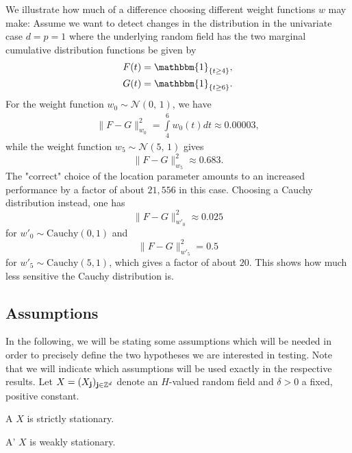 \begin{ex} \label{example: two distribution function dependent on weight function}
    We illustrate how much of a difference choosing different weight functions $w$ may make: Assume we want to detect changes in the distribution in the univariate case $d=p=1$ where the underlying random field has the two marginal cumulative distribution functions be given by
    \begin{align*}
        & F(t) = \mathbbm{1}_{\{t \geq 4\}}, \\
        & G(t) = \mathbbm{1}_{\{t \geq 6\}}.
    \end{align*}
    For the weight function $w_0 \sim \mathcal{N}(0,\, 1)$, we have
    \begin{align*}
        \| F - G \|^2_{w_0} = \int\limits_{4}^6 w_0(t)dt \approx 0.00003,
    \end{align*}
    while the weight function $w_{5} \sim \mathcal{N}(5,\, 1)$ gives
    \[  \| F - G \|^2_{w_{5}} \approx 0.683. \]
    The "correct" choice of the location parameter amounts to an increased performance by a factor of about $21,556$ in this case.
    Choosing a Cauchy distribution instead, one has
    \[ \| F - G \|^2_{w'_{0}} \approx 0.025 \]
    for $w'_0 \sim \mathrm{Cauchy}(0, 1)$ and
    \[ \| F - G \|^2_{w'_{5}} = 0.5 \]
    for $w'_{5} \sim \mathrm{Cauchy}(5, 1)$, which gives a factor of about $20$. This shows how much less sensitive the Cauchy distribution is.
\end{ex}

\subsection{Assumptions} \label{section:assumptions}

In the following, we will be stating some assumptions which will be needed in order to precisely define the two hypotheses we are interested in testing. Note that we will indicate which assumptions will be used exactly in the respective results.
Let $X = (X_\mathbf{j})_{\mathbf{j} \in \mathbb{Z}^d}$ denote an $H$-valued random field and $\delta > 0$ a fixed, positive constant.

\begin{assumptionp}{A} \label{assumption:stationarity}
    $X$ is strictly stationary.
\end{assumptionp}

\begin{assumptionp}{A'} \label{assumption:weak_stationarity}
    $X$ is weakly stationary.
\end{assumptionp}

